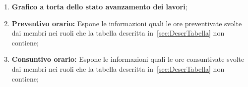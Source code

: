 \begin{enumerate}
    \item \textbf{Grafico a torta dello stato avanzamento dei lavori};
    \item \textbf{Preventivo orario:} Espone le informazioni quali le ore preventivate svolte dai membri nei ruoli che la tabella descritta in~\ref{sec:DescrTabella} non contiene; 
    \item \textbf{Consuntivo orario:} Espone le informazioni quali le ore consuntivate svolte dai membri nei ruoli che la tabella descritta in~\ref{sec:DescrTabella} non contiene; 


\end{enumerate}
